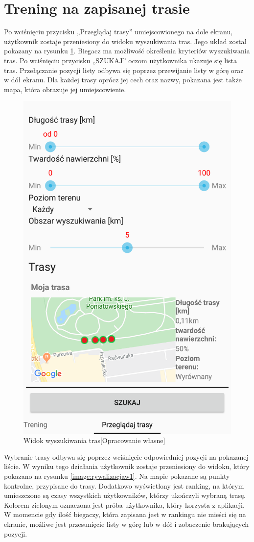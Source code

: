 \section{Trening na zapisanej trasie}
Po wciśnięciu przycisku  „Przeglądaj trasy” umiejscowionego na dole ekranu, użytkownik zostaje przeniesiony do widoku wyszukiwania tras. Jego układ został pokazany na rysunku \ref{image:wyszukiwanie}. Biegacz ma możliwość określenia kryteriów wyszukiwania tras. Po wciśnięciu przycisku „SZUKAJ” oczom użytkownika ukazuje się lista tras. Przełączanie pozycji listy odbywa się poprzez przewijanie listy w górę oraz w dół ekranu. Dla każdej trasy oprócz jej cech oraz nazwy, pokazana jest także mapa, która obrazuje jej umiejscowienie.
\begin{figure}[h]\label{fig:xamarin_model}
\begin{center}
\includegraphics[width=.5\linewidth,frame]{img/wyszukiwanie.png}
\caption{Widok wyszukiwania tras[Opracowanie własne]}\label{image:wyszukiwanie}
\end{center}
\end{figure}

Wybranie trasy odbywa się poprzez wciśnięcie odpowiedniej pozycji na pokazanej liście. W wyniku tego działania użytkownik zostaje przeniesiony do widoku, który pokazano na rysunku \ref{image:rywalizacjaw1}. Na mapie pokazane są punkty kontrolne, przypisane do trasy. Dodatkowo wyświetlony jest ranking, na którym umieszczone są czasy wszystkich użytkowników, którzy ukończyli wybraną trasę. Kolorem zielonym oznaczona jest próba użytkownika, który korzysta z aplikacji. W momencie gdy ilość biegaczy, która zapisana jest w rankingu nie mieści się na ekranie, możliwe jest przesunięcie listy w górę lub w dół i zobaczenie brakujących pozycji.

